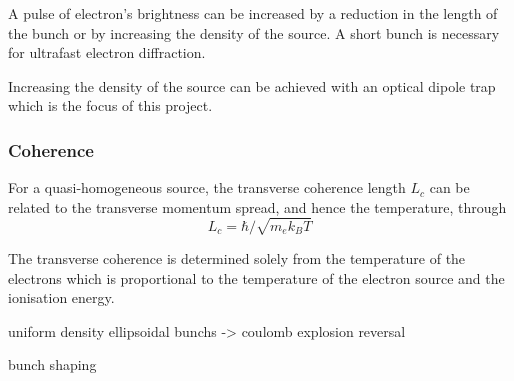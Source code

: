 A pulse of electron's brightness can be increased by a reduction in the length of the bunch or by increasing the density of the source. A short bunch is necessary for ultrafast electron diffraction.

Increasing the density of the source can be achieved with an optical dipole trap which is the focus of this project.

\subsubsection{Coherence}
For a quasi-homogeneous source\cite{nugent_coherent_2009}, the transverse coherence length $L_c$ can be related to the transverse momentum spread, and hence the temperature, through\cite{van_oudheusden_electron_2007}
\begin{equation}
L_c = \hbar/\sqrt{m_e k_B T}
\end{equation}

The transverse coherence is determined solely from the temperature of the electrons which is proportional to the temperature of the electron source and the ionisation energy.



uniform density ellipsoidal bunchs -> coulomb explosion reversal\cite{van_der_geer_simulated_2007}

bunch shaping \cite{mcculloch_arbitrarily_2011}


